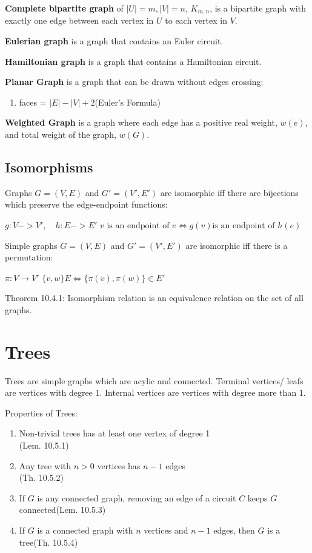 \documentclass[12pt, a4paper]{article}
\begin{document}
\begin{multicols*}{3}
\textbf{Complete bipartite graph} of $|U|=m, |V|=n$, $K_{m,n}$, is a bipartite graph with exactly one edge between each vertex in $U$ to each vertex in $V$. 

\textbf{Eulerian graph} is a graph that contains an Euler circuit.

\textbf{Hamiltonian graph} is a graph that contains a Hamiltonian circuit.

\textbf{Planar Graph} is a graph that can be drawn without edges crossing:
\begin{enumerate}[\roman*.]
  \item faces = $|E| - |V| + 2$\hfill(Euler's Formula)
\end{enumerate}

\textbf{Weighted Graph} is a graph where each edge has a positive real weight, $w(e)$, and total weight of the graph, $w(G)$.

\subsection{Isomorphisms}
Graphs $G = (V, E)$ and $G' = (V', E')$ are isomorphic iff there are bijections which preserve the edge-endpoint functions:\\
{\centering
  $g: V -> V',\quad h: E->E'$
  $v\text{ is an endpoint of }e \iff g(v)\text{is an endpoint of }h(e)$
\par}

Simple graphs $G = (V, E)$ and $G' = (V', E')$ are isomorphic iff there is a permutation:\\
{\centering
  $\pi: V \rightarrow V'$
  $\{v, w\} E \iff \{\pi(v), \pi(w)\} \in E'$
\par}
Theorem 10.4.1: Isomorphism relation is an equivalence relation on the set of all graphs.

\colbreak

\section{Trees}
Trees are simple graphs which are acylic and connected. Terminal vertices/ leafs are vertices with degree 1. Internal vertices are vertices with degree more than 1.

Properties of Trees:
\begin{enumerate}[\roman*.]
  \item Non-trivial trees has at least one vertex of degree 1\\\hfill(Lem. 10.5.1)
  \item Any tree with $n>0$ vertices has $n-1$ edges\\\hfill(Th. 10.5.2)
  \item If $G$ is any connected graph, removing an edge of a circuit $C$ keeps $G$ connected\hfill(Lem. 10.5.3)
  \item If $G$ is a connected graph with $n$ vertices and $n-1$ edges, then $G$ is a tree\hfill(Th. 10.5.4)
\end{enumerate}


\end{multicols*}
\end{document}
